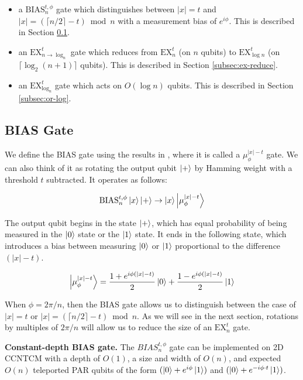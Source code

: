 \begin{itemize}

\item a $\text{BIAS}^{t,\phi}_n$ gate which distinguishes between $|x| = t$ and $|x| = (\lceil n/2 \rceil - t) \bmod n$ with a measurement bias of $e^{i\phi}$.
This is described in Section \ref{subsec:mu-gate}.
\item an $\text{EX}^t_{n\rightarrow \log_n}$ gate which reduces from $\text{EX}^t_n$ (on $n$ qubits)
to $\text{EX}^t_{\log n}$ (on $\lceil \log_2(n+1) \rceil$ qubits).
This is described in Section \ref{subsec:ex-reduce}.
\item an $\text{EX}^t_{\log_n}$ gate which acts on $O(\log n)$ qubits.
This is described in Section \ref{subsec:or-log}.
\end{itemize}

\subsection{BIAS Gate}
\label{subsec:mu-gate}

We define the BIAS gate using the results in \cite{Hoyer2002}, where it is called a $\mu^{|x|-t}_{\phi}$ gate.
We can also think of it as rotating the output qubit $\left\vert{+}\right\rangle$ by Hamming weight with a threshold $t$ subtracted.
It operates as follows:

\begin{equation}
\text{BIAS}^{t,\phi}_n\left\vert{x}\right\rangle\left\vert{+}\right\rangle \rightarrow \left\vert{x}\right\rangle\left\vert{\mu^{|x|-t}_{\phi}}\right\rangle
\end{equation}

The output qubit begins in the state $\left\vert{+}\right\rangle$, which has equal probability of
being measured in the $\left\vert{0}\right\rangle$ state or the $\left\vert{1}\right\rangle$ state. It ends in
the following state, which introduces a bias between measuring $\left\vert{0}\right\rangle$
or $\left\vert{1}\right\rangle$ proportional to the difference $(|x|-t)$.

\begin{equation}
\left\vert{\mu^{|x|-t}_{\phi}}\right\rangle = \frac{1 + e^{i\phi(|x|-t)}}{2}\left\vert{0}\right\rangle + \frac{1 - e^{i\phi(|x|-t)}}{2}\left\vert{1}\right\rangle
\end{equation}

When $\phi = 2\pi / n$, then the BIAS gate allows us to distinguish
between the case of $|x| = t$ or $|x| = (\lceil n/2 \rceil - t) \bmod n$. As we will
see in the next section, rotations by multiples of $2\pi / n$ will allow us to reduce the
size of an $\text{EX}^t_n$ gate.

\begin{theorem}{\textbf{Constant-depth BIAS gate.}}
The $BIAS^{t,\phi}_n$ gate can be implemented on \textsf{2D CCNTCM} with
a depth of $O(1)$, a size and width of $O(n)$, and
expected $O(n)$ teleported PAR qubits of the form $(\left\vert{0}\right\rangle + e^{i\phi}\left\vert{1}\right\rangle)$
and $(\left\vert{0}\right\rangle + e^{-i\phi\cdot t}\left\vert{1}\right\rangle)$.
\label{thm:bias}
\end{theorem}

